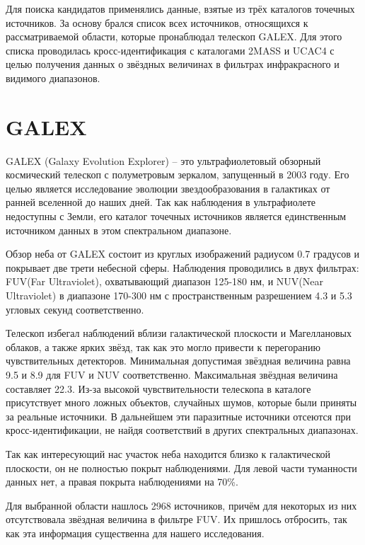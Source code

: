 Для поиска кандидатов применялись данные, взятые из трёх каталогов точечных источников. За основу брался список всех источников, относящихся к рассматриваемой области, которые пронаблюдал телескоп GALEX.
Для этого списка проводилась кросс-идентификация с каталогами 2MASS и UCAC4 с целью получения данных о звёздных величинах в фильтрах инфракрасного и видимого диапазонов. 


\section{GALEX}
GALEX (Galaxy Evolution Explorer) -- это ультрафиолетовый обзорный космический телескоп с полуметровым зеркалом, запущенный в 2003 году. Его целью является исследование эволюции звездообразования в галактиках от ранней вселенной до наших дней. Так как наблюдения в ультрафиолете недоступны с Земли, его каталог точечных источников является единственным источником данных в этом спектральном диапазоне.

Обзор неба от GALEX состоит из круглых изображений радиусом 0.7 градусов и покрывает две трети небесной сферы. Наблюдения проводились в двух фильтрах: FUV(Far Ultraviolet), охватывающий диапазон 125-180 нм, и NUV(Near Ultraviolet) в диапазоне 170-300 нм с пространственным разрешением 4.3 и 5.3 угловых секунд соответственно.


Телескоп избегал наблюдений вблизи галактической плоскости и Магеллановых облаков, а также ярких звёзд, так как это могло привести к перегоранию чувствительных детекторов. Минимальная допустимая звёздная величина равна 9.5 и 8.9 для FUV и NUV соответственно. Максимальная звёздная величина составляет 22.3. Из-за высокой чувствительности телескопа в каталоге присутствует много ложных объектов, случайных шумов, которые были приняты за реальные источники. В дальнейшем эти паразитные источники отсеются при кросс-идентификации, не найдя соответствий в других спектральных диапазонах.

Так как интересующий нас участок неба находится близко к галактической плоскости, он не полностью покрыт наблюдениями. Для левой части туманности данных нет, а правая покрыта наблюдениями на 70\%.


Для выбранной области нашлось 2968 источников, причём для некоторых из них отсутствовала звёздная величина в фильтре FUV. Их пришлось отбросить, так как эта информация существенна для нашего исследования.

